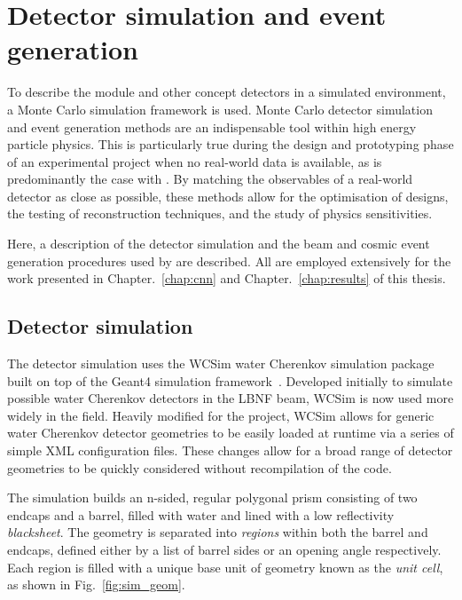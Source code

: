 \section{Detector simulation and event generation} %
\label{sec:chips_monte_carlo} %

To describe the \chipsfive module and other \chips concept detectors in a simulated environment, a
Monte Carlo simulation framework is used. Monte Carlo detector simulation and event generation
methods are an indispensable tool within high energy particle physics. This is particularly true
during the design and prototyping phase of an experimental project when no real-world data is
available, as is predominantly the case with \chips. By matching the observables of a real-world
detector as close as possible, these methods allow for the optimisation of designs, the testing of
reconstruction techniques, and the study of physics sensitivities.

Here, a description of the detector simulation and the beam and cosmic event generation procedures
used by \chips are described. All are employed extensively for the work presented in
Chapter.~\ref{chap:cnn} and Chapter.~\ref{chap:results} of this thesis.

\subsection{Detector simulation} %
\label{sec:chips_monte_carlo_sim} %

The detector simulation uses the WCSim water Cherenkov simulation package~\cite{wcsim2020} built
on top of the Geant4 simulation framework~\cite{agostinelli2003, allison2006, allison2016}.
Developed initially to simulate possible water Cherenkov detectors in the LBNF beam, WCSim is now
used more widely in the field. Heavily modified for the \chips project, WCSim allows for generic
water Cherenkov detector geometries to be easily loaded at runtime via a series of simple XML
configuration files. These changes allow for a broad range of detector geometries to be quickly
considered without recompilation of the code.

The simulation builds an n-sided, regular polygonal prism consisting of two endcaps and a barrel,
filled with water and lined with a low reflectivity \emph{blacksheet}. The geometry is separated
into \emph{regions} within both the barrel and endcaps, defined either by a list of barrel sides
or an opening angle respectively. Each region is filled with a unique base unit of geometry known
as the \emph{unit cell}, as shown in Fig.~\ref{fig:sim_geom}.

